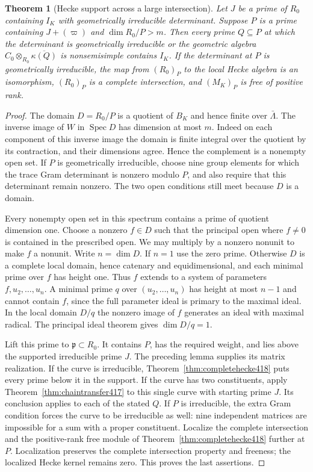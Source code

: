 \documentclass[a4paper,11pt]{article}
\newtheorem{theorem}[proposition]{Theorem}
\theoremstyle{definition}
\theoremstyle{remark}
\numberwithin{equation}{section}
\begin{document}
\begin{theorem}[Hecke support across a large intersection]\leavevmode
\label{thm:largeintersection419}
Let \(J\) be a prime of \(R_0\) containing \(I_K\) with
geometrically irreducible determinant. Suppose \(P\) is
a prime containing \(J+(\varpi)\) and \(\dim R_0/P>m\).
Then every prime \(Q\subseteq P\) at which the determinant
is geometrically irreducible or the geometric algebra
\(C_0\otimes_{R_0}\overline{\kappa(Q)}\) is nonsemisimple
contains \(I_K\). If the determinant at \(P\) is geometrically
irreducible, the map from \((R_0)_P\) to the local Hecke
algebra is an isomorphism, \((R_0)_P\) is a complete
intersection, and \((M_K)_P\) is free of positive rank.
\end{theorem}
\begin{proof}
The domain \(D=R_0/P\) is a quotient of \(B_K\) and hence
finite over \(\bar\Lambda\). The inverse image of \(W\) in
\(\operatorname{Spec}D\) has dimension at most \(m\).
Indeed on each component of this inverse image the domain
is finite integral over the quotient by its contraction,
and their dimensions agree. Hence the complement is a
nonempty open set. If \(P\) is geometrically irreducible,
choose nine group elements for which the trace Gram
determinant is nonzero modulo \(P\), and also require
that this determinant remain nonzero. The two open
conditions still meet because \(D\) is a domain.

Every nonempty open set in this spectrum contains a prime
of quotient dimension one. Choose a nonzero \(f\in D\) such
that the principal open where \(f\ne0\) is contained in
the prescribed open. We may multiply by a nonzero nonunit
to make \(f\) a nonunit. Write \(n=\dim D\). If \(n=1\)
use the zero prime. Otherwise \(D\) is a complete local
domain, hence catenary and equidimensional, and each minimal
prime over \(f\) has height one. Thus \(f\) extends to a
system of parameters \(f,u_2,\ldots,u_n\). A minimal prime
\(q\) over \((u_2,\ldots,u_n)\) has height at most \(n-1\)
and cannot contain \(f\), since the full parameter ideal
is primary to the maximal ideal. In the local domain \(D/q\)
the nonzero image of \(f\) generates an ideal with maximal
radical. The principal ideal theorem gives \(\dim D/q=1\).

Lift this prime to \(\mathfrak p\subset R_0\). It contains
\(P\), has the required weight, and lies above the supported
irreducible prime \(J\). The preceding lemma supplies its
matrix realization. If the curve is irreducible,
Theorem~\ref{thm:completehecke418} puts every prime below
it in the support. If the curve has two constituents, apply
Theorem~\ref{thm:chaintransfer417} to this single curve
with starting prime \(J\). Its conclusion applies to each
of the stated \(Q\). If \(P\) is irreducible, the extra Gram
condition forces the curve to be irreducible as well: nine
independent matrices are impossible for a sum with a proper
constituent. Localize the complete intersection and the
positive-rank free module of Theorem~\ref{thm:completehecke418}
further at \(P\). Localization preserves the complete
intersection property and freeness; the localized Hecke
kernel remains zero. This proves the last assertions.
\end{proof}
\end{document}
